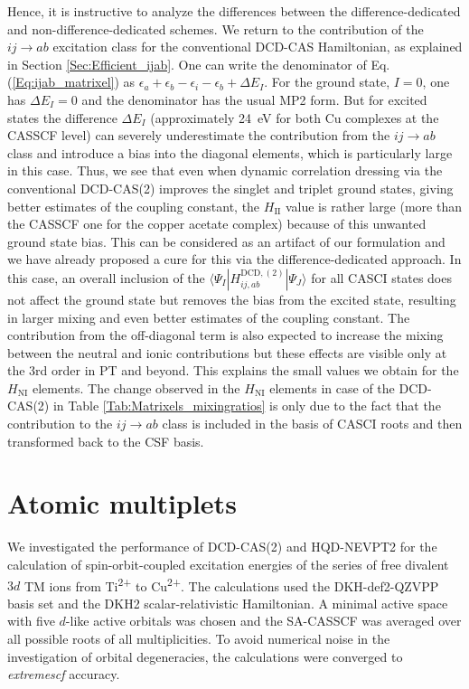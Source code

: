 Hence, it is instructive to analyze the differences between the difference-dedicated and non-difference-dedicated schemes. We return to the contribution of the $ij\rightarrow ab$ excitation class for the conventional DCD-CAS Hamiltonian, as explained in Section \ref{Sec:Efficient_ijab}. One can write the denominator of Eq. (\ref{Eq:ijab_matrixel}) as $\epsilon_a+\epsilon_b - \epsilon_i - \epsilon_b + \Delta E_I$. For the ground state, $I=0$, one has $\Delta E_I=0$ and the denominator has the usual MP2 form. But for excited states the difference $\Delta E_I$ (approximately 24~eV for both Cu complexes at the CASSCF level) can severely underestimate the contribution from the $ij\rightarrow ab$ class and introduce a bias into the diagonal elements, which is particularly large in this case. Thus, we see that even when dynamic correlation dressing via the conventional DCD-CAS(2) improves the singlet and triplet ground states, giving better estimates of the coupling constant, the $H_\text{II}$ value is rather large (more than the CASSCF one for the copper acetate complex) because of this unwanted ground state bias. This can be considered as an artifact of our formulation and we have already proposed a cure for this via the difference-dedicated approach. In this case, an overall inclusion of the  $\langle \Psi _I| H_{ij,ab}^{{\text{DCD}},(2)}  | \Psi _J \rangle $ for all CASCI states does not affect the ground state but removes the bias from the excited state, resulting in larger mixing and even better estimates of the coupling constant. The contribution from the off-diagonal term is also expected to increase the mixing between the neutral and ionic contributions but these effects are visible only at the 3rd order in PT and beyond.\cite{CalzaATCM_2009_44327} This explains the small values we obtain for the $H_{\text{NI}}$ elements. The change observed in the $H_{\text{NI}}$ elements in case of the DCD-CAS(2) in Table \ref{Tab:Matrixels_mixingratios} is only due to the fact that the contribution to the $ij\rightarrow ab$ class is included in the basis of CASCI roots and then transformed back to the CSF basis.

\section{Atomic multiplets}
We investigated the performance of DCD-CAS(2) and HQD-NEVPT2 for the calculation of spin-orbit-coupled excitation energies of the series of free divalent $3d$ TM ions from Ti\textsuperscript{2+} to Cu\textsuperscript{2+}. The calculations used the DKH-def2-QZVPP\cite{PantaCLN_2008_908} basis set and the DKH2\cite{Hess_1986_3742, JanseH_1989_6016} scalar-relativistic Hamiltonian. A minimal active space with five $d$-like active orbitals was chosen and the SA-CASSCF was averaged over all possible roots of all multiplicities. To avoid numerical noise in the investigation of orbital degeneracies, the calculations were converged to \textit{extremescf} accuracy.

